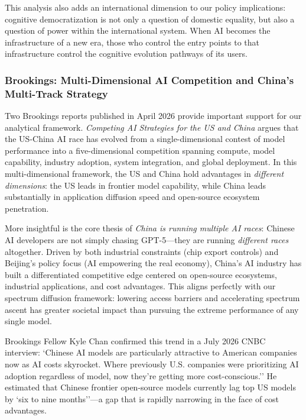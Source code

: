 ﻿\documentclass[12pt,a4paper]{article}
\begin{document}
This analysis also adds an international dimension to our policy implications: cognitive democratization is not only a question of domestic equality, but also a question of power within the international system. When AI becomes the infrastructure of a new era, those who control the entry points to that infrastructure control the cognitive evolution pathways of its users.


\subsubsection{Brookings: Multi-Dimensional AI Competition and China's Multi-Track Strategy}

Two Brookings reports published in April 2026 provide important support for our analytical framework. \textit{Competing AI Strategies for the US and China} argues that the US-China AI race has evolved from a single-dimensional contest of model performance into a five-dimensional competition spanning compute, model capability, industry adoption, system integration, and global deployment. In this multi-dimensional framework, the US and China hold advantages in \textit{different dimensions}: the US leads in frontier model capability, while China leads substantially in application diffusion speed and open-source ecosystem penetration.

More insightful is the core thesis of \textit{China is running multiple AI races}: Chinese AI developers are not simply chasing GPT-5---they are running \textit{different races} altogether. Driven by both industrial constraints (chip export controls) and Beijing's policy focus (AI empowering the real economy), China's AI industry has built a differentiated competitive edge centered on open-source ecosystems, industrial applications, and cost advantages. This aligns perfectly with our spectrum diffusion framework: lowering access barriers and accelerating spectrum ascent has greater societal impact than pursuing the extreme performance of any single model.

Brookings Fellow Kyle Chan confirmed this trend in a July 2026 CNBC interview: `Chinese AI models are particularly attractive to American companies now as AI costs skyrocket. Where previously U.S. companies were prioritizing AI adoption regardless of model, now they're getting more cost-conscious.'' He estimated that Chinese frontier open-source models currently lag top US models by `six to nine months''---a gap that is rapidly narrowing in the face of cost advantages.
\end{document}
